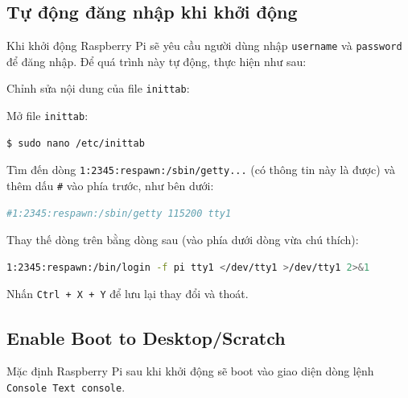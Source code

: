 \documentclass[12pt,a4paper]{article}
\begin{document}
\newpage

\subsection{Tự động đăng nhập khi khởi động}
	Khi khởi động Raspberry Pi sẽ yêu cầu người dùng nhập \verb|username| và \verb|password| để đăng nhập. Để quá trình này tự động, thực hiện như sau:
	\begin{list}{--}{}
		\item Chỉnh sửa nội dung của file \verb|inittab|:
			\begin{list}{+}{}
				\item Mở file \verb|inittab|:
				\begin{lstlisting}[language=bash]
$ sudo nano /etc/inittab
				\end{lstlisting}

				\item Tìm đến dòng \verb|1:2345:respawn:/sbin/getty...| (có thông tin này là được) và thêm dấu \verb|#| vào phía trước, như bên dưới:
					\begin{lstlisting}[language=bash]
#1:2345:respawn:/sbin/getty 115200 tty1
					\end{lstlisting}
				
				\item Thay thế dòng trên bằng dòng sau (vào phía dưới dòng vừa chú thích):
					\begin{lstlisting}[language=bash]
1:2345:respawn:/bin/login -f pi tty1 </dev/tty1 >/dev/tty1 2>&1
					\end{lstlisting}
				
				\item Nhấn \verb|Ctrl + X + Y| để lưu lại thay đổi và thoát.
			\end{list} 
	\end{list}
	
\subsection{Enable Boot to Desktop/Scratch}
	Mặc định Raspberry Pi sau khi khởi động sẽ boot vào giao diện dòng lệnh \verb|Console Text console|.
\end{document}
